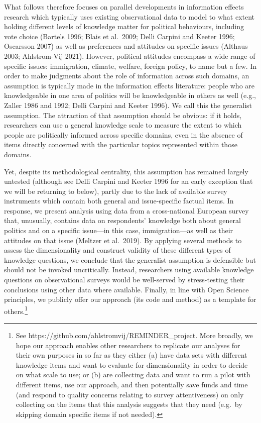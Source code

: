 \documentclass[12pt,halfline,a4paper,]{ouparticle}
\begin{document}
What follows therefore focuses on parallel developments in information
effects research which typically uses existing observational data to
model to what extent holding different levels of knowledge matter for
political behaviours, including vote choice (Bartels 1996; Blais et
al.~2009; Delli Carpini and Keeter 1996; Oscarsson 2007) as well as
preferences and attitudes on specific issues (Althaus 2003; Ahlstrom-Vij
2021). However, political attitudes encompass a wide range of specific
issues: immigration, climate, welfare, foreign policy, to name but a
few. In order to make judgments about the role of information across
such domains, an assumption is typically made in the information effects
literature: people who are knowledgeable in one area of politics will be
knowledgeable in others as well (e.g., Zaller 1986 and 1992; Delli
Carpini and Keeter 1996). We call this the generalist assumption. The
attraction of that assumption should be obvious: if it holds,
researchers can use a general knowledge scale to measure the extent to
which people are politically informed across specific domains, even in
the absence of items directly concerned with the particular topics
represented within those domains.

Yet, despite its methodological centrality, this assumption has remained
largely untested (although see Delli Carpini and Keeter 1996 for an
early exception that we will be returning to below), partly due to the
lack of available survey instruments which contain both general and
issue-specific factual items. In response, we present analysis using
data from a cross-national European survey that, unusually, contains
data on respondents' knowledge both about general politics and on a
specific issue---in this case, immigration---as well as their attitudes
on that issue (Meltzer et al.~2019). By applying several methods to
assess the dimensionality and construct validity of these different
types of knowledge questions, we conclude that the generalist assumption
is defensible but should not be invoked uncritically. Instead,
researchers using available knowledge questions on observational surveys
would be well-served by stress-testing their conclusions using other
data where available. Finally, in line with Open Science principles, we
publicly offer our approach (its code and method) as a template for
others.\footnote{See https://github.com/ahlstromvij/REMINDER\_project.
  More broadly, we hope our approach enables other researchers to
  replicate our analyses for their own purposes in so far as they either
  (a) have data sets with different knowledge items and want to evaluate
  for dimensionality in order to decide on what scale to use; or (b) are
  collecting data and want to run a pilot with different items, use our
  approach, and then potentially save funds and time (and respond to
  quality concerns relating to survey attentiveness) on only collecting
  on the items that this analysis suggests that they need (e.g.~by
  skipping domain specific items if not needed).}
\end{document}
